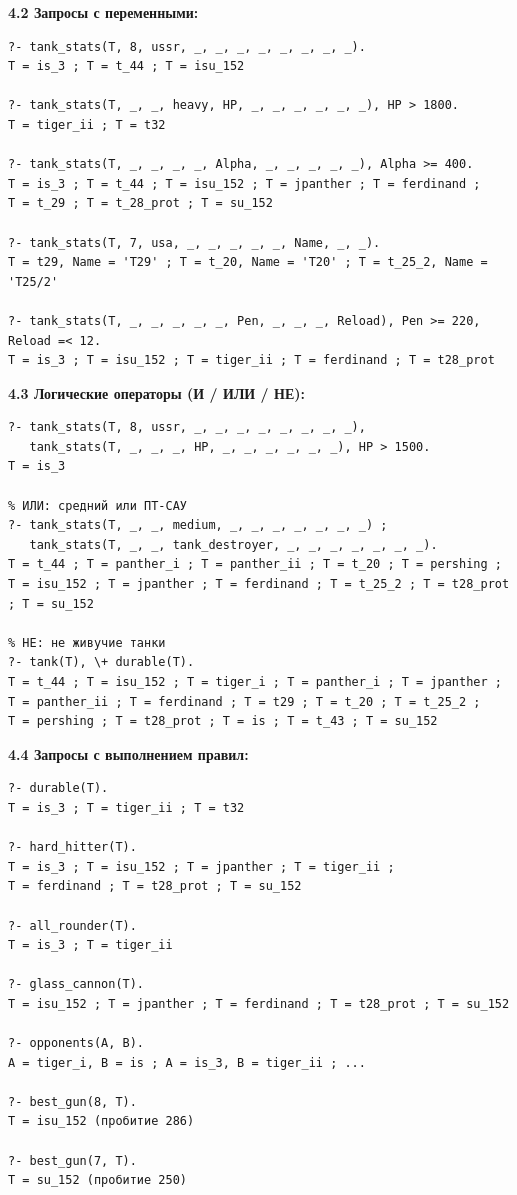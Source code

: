 \documentclass[12pt,a4paper]{article}
\begin{document}
\textbf{4.2 Запросы с переменными:}

\begin{lstlisting}[style=prolog,language={},numbers=none,frame=none,basicstyle=\ttfamily\small]
?- tank_stats(T, 8, ussr, _, _, _, _, _, _, _, _).
T = is_3 ; T = t_44 ; T = isu_152

?- tank_stats(T, _, _, heavy, HP, _, _, _, _, _, _), HP > 1800.
T = tiger_ii ; T = t32

?- tank_stats(T, _, _, _, _, Alpha, _, _, _, _, _), Alpha >= 400.
T = is_3 ; T = t_44 ; T = isu_152 ; T = jpanther ; T = ferdinand ;
T = t_29 ; T = t_28_prot ; T = su_152

?- tank_stats(T, 7, usa, _, _, _, _, _, Name, _, _).
T = t29, Name = 'T29' ; T = t_20, Name = 'T20' ; T = t_25_2, Name = 'T25/2'

?- tank_stats(T, _, _, _, _, _, Pen, _, _, _, Reload), Pen >= 220, Reload =< 12.
T = is_3 ; T = isu_152 ; T = tiger_ii ; T = ferdinand ; T = t28_prot
\end{lstlisting}

\textbf{4.3 Логические операторы (И / ИЛИ / НЕ):}

\begin{lstlisting}[style=prolog,language={},numbers=none,frame=none,basicstyle=\ttfamily\small]
% И: уровень 8, СССР, HP > 1500
?- tank_stats(T, 8, ussr, _, _, _, _, _, _, _, _),
   tank_stats(T, _, _, _, HP, _, _, _, _, _, _), HP > 1500.
T = is_3

% ИЛИ: средний или ПТ-САУ
?- tank_stats(T, _, _, medium, _, _, _, _, _, _, _) ;
   tank_stats(T, _, _, tank_destroyer, _, _, _, _, _, _, _).
T = t_44 ; T = panther_i ; T = panther_ii ; T = t_20 ; T = pershing ;
T = isu_152 ; T = jpanther ; T = ferdinand ; T = t_25_2 ; T = t28_prot ; T = su_152

% НЕ: не живучие танки
?- tank(T), \+ durable(T).
T = t_44 ; T = isu_152 ; T = tiger_i ; T = panther_i ; T = jpanther ;
T = panther_ii ; T = ferdinand ; T = t29 ; T = t_20 ; T = t_25_2 ;
T = pershing ; T = t28_prot ; T = is ; T = t_43 ; T = su_152
\end{lstlisting}

\textbf{4.4 Запросы с выполнением правил:}

\begin{lstlisting}[style=prolog,language={},numbers=none,frame=none,basicstyle=\ttfamily\small]
?- durable(T).
T = is_3 ; T = tiger_ii ; T = t32

?- hard_hitter(T).
T = is_3 ; T = isu_152 ; T = jpanther ; T = tiger_ii ;
T = ferdinand ; T = t28_prot ; T = su_152

?- all_rounder(T).
T = is_3 ; T = tiger_ii

?- glass_cannon(T).
T = isu_152 ; T = jpanther ; T = ferdinand ; T = t28_prot ; T = su_152

?- opponents(A, B).
A = tiger_i, B = is ; A = is_3, B = tiger_ii ; ...

?- best_gun(8, T).
T = isu_152 (пробитие 286)

?- best_gun(7, T).
T = su_152 (пробитие 250)
\end{lstlisting}
\end{document}
